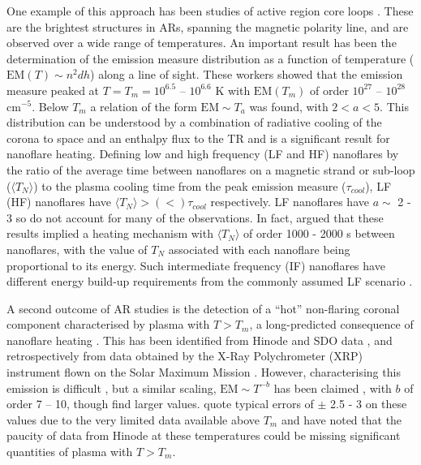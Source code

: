 \documentclass[apj]{emulateapj}
\begin{document}
	\par One example of this approach has been studies of active region core loops \citep{warren_constraints_2011,warren_systematic_2012,winebarger_using_2011,tripathi_emission_2011,schmelz_cold_2012,bradshaw_diagnosing_2012,reep_diagnosing_2013,del_zanna_elemental_2014}. These are the brightest structures in ARs, spanning the magnetic polarity line, and are observed over a wide range of temperatures. An important result has been the determination of the emission measure distribution as a function of temperature ($\mathrm{EM}(T)\sim n^2dh$) along a line of sight. These workers showed that the emission measure peaked at $T = T_m = 10^{6.5}$ – $10^{6.6}$ K with $\mathrm{EM}(T_m)$ of order $10^{27}$ – $10^{28}$ cm$^{-5}$.  Below $T_m$ a relation of the form $\mathrm{EM} \sim T_a$ was found, with $2 < a < 5$. This distribution can be understood by a combination of radiative cooling of the corona to space and an enthalpy flux to the TR \citep[e.g.][]{bradshaw_new_2010,bradshaw_cooling_2010} and is a significant result for nanoflare heating. Defining low and high frequency (LF and HF) nanoflares by the ratio of the average time between nanoflares on a magnetic strand or sub-loop ($\langle T_N \rangle$) to the plasma cooling time from the peak emission measure ($\tau_{cool}$), LF (HF) nanoflares have $\langle T_N \rangle > (<) \tau_{cool}$ respectively. LF nanoflares have $a \sim$ 2 - 3 so do not account for many of the observations. In fact, \citet{cargill_active_2014} argued that these results implied a heating mechanism with $\langle T_N \rangle$ of order 1000 - 2000 s between nanoflares, with the value of $T_N$ associated with each nanoflare being proportional to its energy. Such intermediate frequency (IF) nanoflares have different energy build-up requirements from the commonly assumed LF scenario \citep{cargill_active_2014}.  
%
	\par A second outcome of AR studies is the detection of a ``hot'' non-flaring coronal component characterised by plasma with $T > T_m$, a long-predicted consequence of nanoflare heating \citep{cargill_implications_1994,cargill_diagnostics_1995}. This has been identified from Hinode and SDO data \citep{testa_hinode/eis_2012,reale_evidence_2009}, and retrospectively from data obtained by the X-Ray Polychrometer (XRP) instrument flown on the Solar Maximum Mission \citep{del_zanna_elemental_2014}. However, characterising this emission is difficult \citep[e.g.][]{winebarger_defining_2012}, but a similar scaling, $\mathrm{EM} \sim T^{-b}$ has been claimed \citep[e.g.][]{warren_systematic_2012}, with $b$ of order 7 – 10, though \citet{del_zanna_elemental_2014} find larger values. \citeauthor{warren_systematic_2012} quote typical errors of $\pm$ 2.5 - 3 on these values due to the very limited data available above $T_m$ and \citet{winebarger_defining_2012} have noted that the paucity of data from Hinode at these temperatures could be missing significant quantities of plasma with $T > T_m$. 
\end{document}
